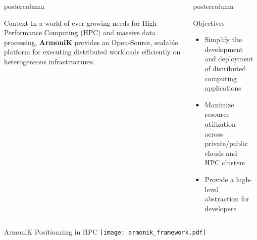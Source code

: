 \begin{frame}[fragile]

  \begin{columns}[T]
    \begin{column}{.49\textwidth}
      \begin{beamercolorbox}[center,wd=\textwidth]{postercolumn}
        \begin{minipage}[T]{.96\textwidth}
            \begin{block}{Context}
              In a world of ever-growing needs for High-Performance Computing (HPC) and massive data processing, \textbf{ArmoniK} provides an Open-Source, scalable platform for executing distributed workloads efficiently on heterogeneous infrastructures.
            \end{block}
        \end{minipage}
      \end{beamercolorbox}
      \vfill
    \end{column}
    \begin{column}{.49\textwidth}
      \begin{beamercolorbox}[center,wd=\textwidth]{postercolumn}
        \begin{minipage}[T]{.96\textwidth}
              \begin{block}{Objectives}
                \begin{itemize}
                  \item Simplify the development and deployment of distributed computing applications
                  \item Maximize resource utilization across private/public clouds and HPC clusters
                  \item Provide a high-level abstraction for developers
                \end{itemize}
              \end{block}
        \end{minipage}
      \end{beamercolorbox}
    \end{column}
  \end{columns}

  \begin{center}
  \begin{minipage}[T]{.975\textwidth}
  \begin{block}{ArmoniK Positionning in HPC}
    \centering
    \texttt{[image: armonik\_framework.pdf]}
  \end{block}
  \end{minipage}
  \end{center}


\end{frame}
